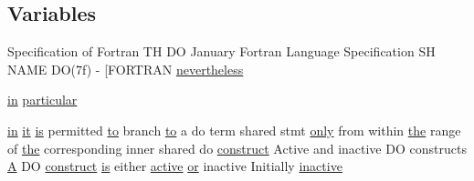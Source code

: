 \subsection*{Variables}
\begin{DoxyCompactItemize}
\item 
Specification of Fortran TH DO January Fortran Language Specification SH N\+A\+ME DO(7f) -\/ \mbox{[}\+F\+O\+R\+T\+R\+AN \hyperlink{do_87_8txt_ab7258a51438c0e5ab53918c2e80ad857}{nevertheless}
\item 
\hyperlink{M__journal_83_8txt_afce72651d1eed785a2132bee863b2f38}{in} \hyperlink{do_87_8txt_aae36f036c0d7b1178771b2e41ac8070a}{particular}
\item 
\hyperlink{M__journal_83_8txt_afce72651d1eed785a2132bee863b2f38}{in} \hyperlink{what__overview_81_8txt_a1468cf345691ca45f70578e0b7abd264}{it} \hyperlink{intro__blas1_83_8txt_a42a91df93f840595de3019ceb5d1df23}{is} permitted \hyperlink{M__stopwatch_83_8txt_a97209fd3e34ef701c0a9734280779cbb}{to} branch \hyperlink{M__stopwatch_83_8txt_a97209fd3e34ef701c0a9734280779cbb}{to} a do term shared stmt \hyperlink{M__time_83_8txt_a944d4b6c63c2e981d8b0d36199afdfdd}{only} from within \hyperlink{M__stopwatch_83_8txt_a0f266597de2e57eb3aa964927bb30e14}{the} range of \hyperlink{M__stopwatch_83_8txt_a0f266597de2e57eb3aa964927bb30e14}{the} corresponding inner shared do \hyperlink{exit_87_8txt_aa7ebb4c04e8aa413d646a62e1f67fb5c}{construct} Active and inactive DO constructs \hyperlink{ufpp__overview_81_8txt_a8341271e5f4e3003f6eb1c9547fc9d1a}{A} DO \hyperlink{exit_87_8txt_aa7ebb4c04e8aa413d646a62e1f67fb5c}{construct} \hyperlink{intro__blas1_83_8txt_a42a91df93f840595de3019ceb5d1df23}{is} either \hyperlink{do_87_8txt_a3300b8e9ebbb88612226328b1b2fd93f}{active} \hyperlink{what__overview_81_8txt_a93f5d39a36ed511cc0dc88a20a517388}{or} inactive Initially \hyperlink{do_87_8txt_a510b16c990ba8c721e7968e80da73f30}{inactive}
\item 

\end{DoxyCompactItemize}
